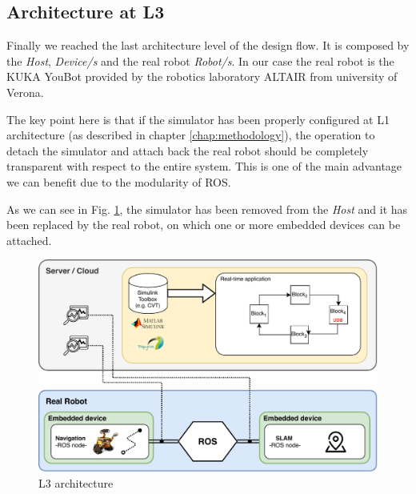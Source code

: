 \subsection{Architecture at L3}	%
Finally we reached the last architecture level of the design flow. It is composed by the \textit{Host}, \textit{Device/s } and the real robot \textit{Robot/s}. In our case the real robot is the KUKA YouBot \cite{YouBot} provided by the robotics laboratory ALTAIR  from university of Verona.

The key point here is that if the simulator has been properly configured at L1 architecture (as described in chapter \ref{chap:methodology}),  the operation to detach the simulator and attach back the real robot should be completely transparent with respect to the entire system. This is one of the main advantage we can benefit due to the modularity of ROS.

As we can see in Fig. \ref{fig:l3archexp}, the simulator has been removed from the \textit{Host} and it has been replaced by the real robot, on which one or more embedded devices can be attached.



\begin{figure}[htbp]
	\centering
	\includegraphics[width=\textwidth]{images/L3-arch}
	\caption{L3 architecture}
	\label{fig:l3archexp}
\end{figure}


